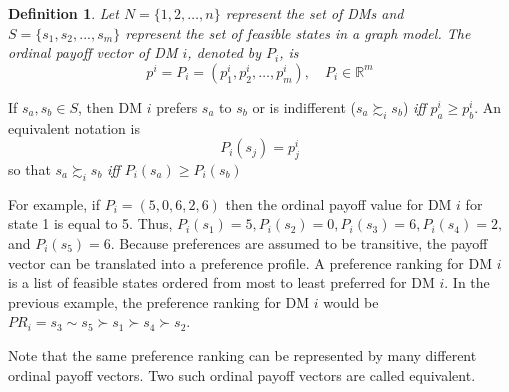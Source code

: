 \documentclass[letterpaper,12pt,titlepage,oneside,final]{book}
\newtheorem{definition}[lemma]{Definition}
\begin{document}
\begin{definition}
\rm

Let $N=\{1,2,\dots,n\}$ represent the set of DMs and $S=\{s_1, s_2, ..., s_m\}$ represent the set of feasible states in a graph model. The ordinal payoff vector of DM $i$, denoted by $P_i$, is
$$p^i=P_i=(p_1^i,p_2^i, \dots ,p_m^i ) , \quad P_i \in \mathbb{R}^m  $$

\end{definition}

\noindent If $s_a,s_b \in S$, then DM $i$ prefers $s_a$ to $s_b$ or is indifferent ($s_a \succsim_i s_b$) \emph{iff} $p_a^i \geq p_b^i$. An equivalent notation is $$P_i(s_j)=p_j^i$$ so that $s_a\succsim_i s_b$ \emph{iff} $P_i(s_a)\geq P_i(s_b)$

For example, if $P_i=(5,0,6,2,6)$ then the ordinal payoff value for DM $i$ for state 1 is equal to 5. Thus, $P_i(s_1)=5,P_i(s_2)=0,P_i(s_3)=6,P_i(s_4)=2,$ and $P_i(s_5)=6$. Because preferences are assumed to be transitive, the payoff vector can be translated into a preference profile. A preference ranking for DM $i$ is a list of feasible states ordered from most to least preferred for DM $i$. %
In the previous example, the preference ranking for DM $i$ would be $PR_i=s_3 \sim s_5 \succ s_1 \succ s_4 \succ s_2$.

Note that the same preference ranking can be represented by many different ordinal payoff vectors. Two such ordinal payoff vectors are called equivalent.

\end{document}
